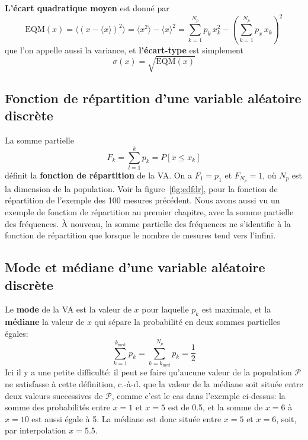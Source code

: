 \textbf{L'écart quadratique moyen} est donné par
\begin{equation}
    \text{EQM}(x)=\langle (x-\langle x\rangle)^2\rangle=\langle x^2\rangle-\langle x\rangle^2=\sum_{k=1}^{N_p}p_k\,x_k^2-\left(\sum_{k=1}^{N_p}p_x\,x_k\right)^2
\end{equation}
que l'on appelle aussi la variance, et \textbf{l'écart-type} est simplement
\begin{equation}
    \sigma(x)=\sqrt{\text{EQM}(x)}
\end{equation}

\subsection{Fonction de répartition d'une variable aléatoire discrète}

La somme partielle
\begin{equation}
    F_k=\sum_{l=1}^{k} p_k=P[x\le x_k]
\end{equation}
définit la \textbf{fonction de répartition} de la VA. On a $F_1=p_1$ et $F_{N_p}=1$, où $N_p$ est la dimension de la population. Voir la figure~\ref{fig:edfdr}, pour la fonction de répartition de l'exemple des 100 mesures précédent. Nous avons aussi vu un exemple de fonction de répartition au premier chapitre, avec la somme partielle des fréquences. À nouveau, la somme partielle des fréquences ne s'identifie à la fonction de répartition que lorsque le nombre de mesures tend vers l'infini.

\subsection{Mode et médiane d'une variable aléatoire discrète}

Le \textbf{mode} de la VA est la valeur de $x$ pour laquelle $p_k$ est maximale, et la \textbf{médiane} la valeur de $x$ qui sépare la probabilité en deux sommes partielles égales:
\begin{equation}
    \sum_{k=1}^{k_{\text{med}}}p_k=\sum_{k=k_{\text{med}}}^{N_p}p_k=\frac{1}{2}
\end{equation}
Ici il y a une petite difficulté: il peut se faire qu'aucune valeur de la population $\mathcal{P}$ ne satisfasse à cette définition, c.-à-d. que la valeur de la médiane soit située entre deux valeurs successives de $\mathcal{P}$, comme c'est le cas dans l'exemple ci-dessus: la somme des probabilités entre $x=1$ et $x=5$ est de 0.5, et la somme de $x=6$ à $x=10$ est aussi égale à 5. La médiane est donc située entre $x=5$ et $x=6$, soit, par interpolation $x=5.5$.

